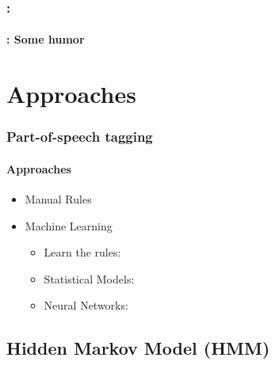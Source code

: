 \documentclass[xcolor=table]{beamer}
\begin{document}
\begin{frame}
	\frametitle{\insertshortsubtitle: \insertsection}
	\framesubtitle{\insertsubsection: Some humor}

	\begin{center}
	\end{center}

\end{frame}

\section{Approaches}

\begin{frame}
\frametitle{Part-of-speech tagging}
\framesubtitle{Approaches}

\begin{itemize}
	\item Manual Rules
	\item Machine Learning
	\begin{itemize}
		\item Learn the rules: 
		\item Statistical Models: 
		\item Neural Networks: 
	\end{itemize}
\end{itemize}

\end{frame}

\subsection{Hidden Markov Model (HMM)}
\end{document}
